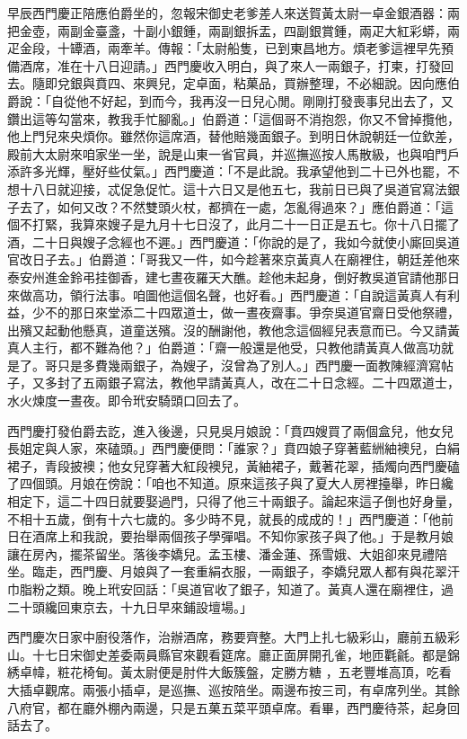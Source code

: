 \begin{showcontents}{}
早辰西門慶正陪應伯爵坐的，忽報宋御史老爹差人來送賀黃太尉一卓金銀酒器：兩把金壺，兩副金臺盞，十副小銀鍾，兩副銀拆盂，四副銀賞鍾，兩疋大紅彩蟒，兩疋金段，十罈酒，兩牽羊。傳報：「太尉船隻，已到東昌地方。煩老爹這裡早先預備酒席，准在十八日迎請。」西門慶收入明白，與了來人一兩銀子，打柬，打發回去。隨即兌銀與賁四、來興兒，定卓面，粘菓品，買辦整理，不必細說。因向應伯爵說：「自從他不好起，到而今，我再沒一日兒心閒。剛剛打發喪事兒出去了，又鑽出這等勾當來，教我手忙腳亂。」伯爵道：「這個哥不消抱怨，你又不曾掉攬他，他上門兒來央煩你。雖然你這席酒，替他賠幾面銀子。到明日休說朝廷一位欽差，殿前大太尉來咱家坐一坐，說是山東一省官員，并巡撫巡按人馬散級，也與咱門戶添許多光輝，壓好些仗氣。」西門慶道：「不是此說。我承望他到二十已外也罷，不想十八日就迎接，忒促急促忙。這十六日又是他五七，我前日已與了吳道官寫法銀子去了，如何又改？不然雙頭火杖，都擠在一處，怎亂得過來？」應伯爵道：「這個不打緊，我算來嫂子是九月十七日沒了，此月二十一日正是五七。你十八日擺了酒，二十日與嫂子念經也不遲。」西門慶道：「你說的是了，我如今就使小廝回吳道官改日子去。」伯爵道：「哥我又一件，如今趁著來京黃真人在廟裡住，朝廷差他來泰安州進金鈴弔挂御香，建七晝夜羅天大醮。趁他未起身，倒好教吳道官請他那日來做高功，領行法事。咱圖他這個名聲，也好看。」西門慶道：「自說這黃真人有利益，少不的那日來堂添二十四眾道士，做一晝夜齋事。爭奈吳道官齋日受他祭禮，出殯又起動他懸真，道童送殯。沒的酬謝他，教他念這個經兒表意而已。今又請黃真人主行，都不難為他？」伯爵道：「齋一般還是他受，只教他請黃真人做高功就是了。哥只是多費幾兩銀子，為嫂子，沒曾為了別人。」西門慶一面教陳經濟寫帖子，又多封了五兩銀子寫法，教他早請黃真人，改在二十日念經。二十四眾道士，水火煉度一晝夜。即令玳安騎頭口回去了。

西門慶打發伯爵去訖，進入後邊，只見吳月娘說：「賁四嫂買了兩個盒兒，他女兒長姐定與人家，來磕頭。」西門慶便問：「誰家？」賁四娘子穿著藍絒紬襖兒，白絹裙子，青段披襖；他女兒穿著大紅段襖兒，黃紬裙子，戴著花翠，插燭向西門慶磕了四個頭。月娘在傍說：「咱也不知道。原來這孩子與了夏大人房裡擡舉，昨日纔相定下，這二十四日就要娶過門，只得了他三十兩銀子。論起來這子倒也好身量，不相十五歲，倒有十六七歲的。多少時不見，就長的成成的！」西門慶道：「他前日在酒席上和我說，要抬舉兩個孩子學彈唱。不知你家孩子與了他。」于是教月娘讓在房內，擺茶留坐。落後李嬌兒。孟玉樓、潘金蓮、孫雪娥、大姐卻來見禮陪坐。臨走，西門慶、月娘與了一套重絹衣服，一兩銀子，李嬌兒眾人都有與花翠汗巾脂粉之類。晚上玳安回話：「吳道官收了銀子，知道了。黃真人還在廟裡住，過二十頭纔回東京去，十九日早來鋪設壇場。」

西門慶次日家中廚役落作，治辦酒席，務要齊整。大門上扎七級彩山，廳前五級彩山。十七日宋御史差委兩員縣官來觀看筵席。廳正面屏開孔雀，地匝氍毹。都是錦綉卓幃，粧花椅甸。黃太尉便是肘件大飯簇盤，定勝方糖 ，五老豐堆高頂，吃看大插卓觀席。兩張小插卓，是巡撫、巡按陪坐。兩邊布按三司，有卓席列坐。其餘八府官，都在廳外棚內兩邊，只是五菓五菜平頭卓席。看畢，西門慶待茶，起身回話去了。


\end{showcontents}
